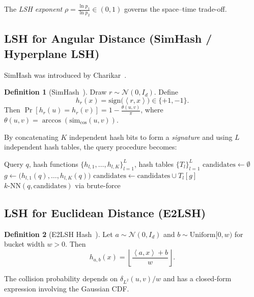 \documentclass[11pt,a4paper]{article}
\theoremstyle{definition}
\newtheorem{definition}{Definition}[section]
\newcommand{\inner}[2]{\left\langle #1, #2 \right\rangle}
\begin{document}
The \emph{LSH exponent} $\rho = \frac{\ln p_1}{\ln p_2} \in (0,1)$
governs the space--time trade-off.

\subsection{LSH for Angular Distance (SimHash / Hyperplane LSH)}

SimHash was introduced by Charikar~\cite{charikar2002simhash}.

\begin{definition}[SimHash~\cite{charikar2002simhash}]
Draw $r \sim \mathcal{N}(0, I_d)$.  Define
\[
  h_r(x) = \mathrm{sign}\bigl(\inner{r}{x}\bigr) \in \{+1, -1\}.
\]
Then $\Pr[h_r(u) = h_r(v)] = 1 - \frac{\theta(u,v)}{\pi}$, where
$\theta(u,v) = \arccos(\mathrm{sim}_{\cos}(u,v))$.
\end{definition}

By concatenating $K$ independent hash bits to form a \emph{signature} and
using $L$ independent hash tables, the query procedure becomes:

\begin{algorithm}[H]
\caption{LSH Query ($L$ tables, $K$ bits each)}
\begin{algorithmic}[1]
\Require Query $q$, hash functions $\{h_{l,1},\ldots,h_{l,K}\}_{l=1}^L$, hash tables $\{T_l\}_{l=1}^L$
\State $\mathrm{candidates} \gets \emptyset$
  \State $g \gets \bigl(h_{l,1}(q), \ldots, h_{l,K}(q)\bigr)$ 
  \State $\mathrm{candidates} \gets \mathrm{candidates} \cup T_l[g]$
\EndFor
\State \Return $k\text{-NN}(q, \mathrm{candidates})$ via brute-force
\end{algorithmic}
\end{algorithm}

\subsection{LSH for Euclidean Distance (E2LSH)}

\begin{definition}[E2LSH Hash~\cite{datar2004e2lsh}]
Let $a \sim \mathcal{N}(0, I_d)$ and $b \sim \mathrm{Uniform}[0, w)$
for bucket width $w > 0$.  Then
\[
  h_{a,b}(x) = \left\lfloor \frac{\inner{a}{x} + b}{w} \right\rfloor.
\]
\end{definition}

The collision probability depends on $\delta_{L^2}(u,v)/w$ and has a
closed-form expression involving the Gaussian CDF.
\end{document}
